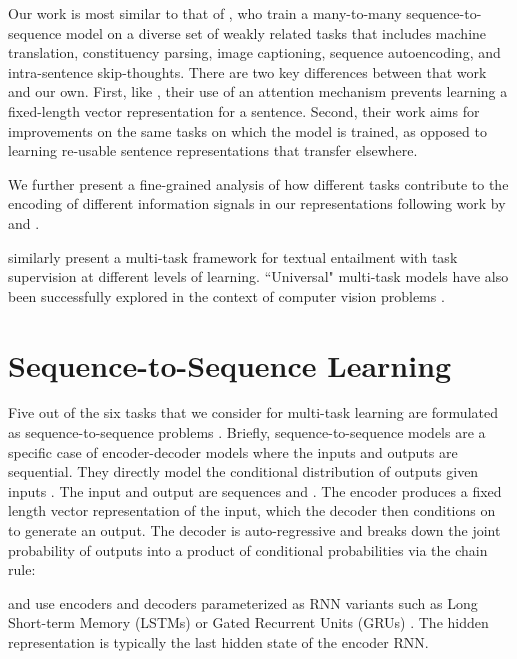 \documentclass{article} \usepackage{iclr2018_conference,times}
\begin{document}
Our work is most similar to that of \cite{luong2015multi}, who train a many-to-many sequence-to-sequence model on a diverse set of weakly related tasks that includes machine translation, constituency parsing, image captioning, sequence autoencoding, and intra-sentence skip-thoughts.
There are two key differences between that work and our own. First, like \cite{mccann2017learned}, their use of an attention mechanism prevents learning a fixed-length vector representation for a sentence. Second, their work aims for improvements on the same tasks on which the model is trained, as opposed to learning re-usable sentence representations that transfer elsewhere.

We further present a fine-grained analysis of how different tasks contribute to the encoding of different information signals in our representations following work by \cite{shi2016does} and \cite{adi2016fine}.

\cite{hashimoto2016joint} similarly present a multi-task framework for textual entailment with task supervision at different levels of learning.
``Universal" multi-task models have also been successfully explored in the context of computer vision problems \citep{kokkinos2016ubernet, eigen2015predicting}.

\section{Sequence-to-Sequence Learning}
\label{section:seq2seq}
Five out of the six tasks that we consider for multi-task learning are formulated as sequence-to-sequence problems \citep{cho2014learning,sutskever2014sequence}. Briefly, sequence-to-sequence models are a specific case of encoder-decoder models where the inputs and outputs are sequential. They directly model the conditional distribution of outputs given inputs . The input  and output  are sequences  and . The encoder produces a fixed length vector representation  of the input, which the decoder then conditions on to generate an output. The decoder is auto-regressive and breaks down the joint probability of outputs into a product of conditional probabilities via the chain rule:


\cite{cho2014learning} and \cite{sutskever2014sequence} use encoders and decoders parameterized as RNN variants such as Long Short-term Memory (LSTMs) \citep{hochreiter1997long} or Gated Recurrent Units (GRUs) \citep{chung2014empirical}. The hidden representation  is typically the last hidden state of the encoder RNN.
\end{document}
